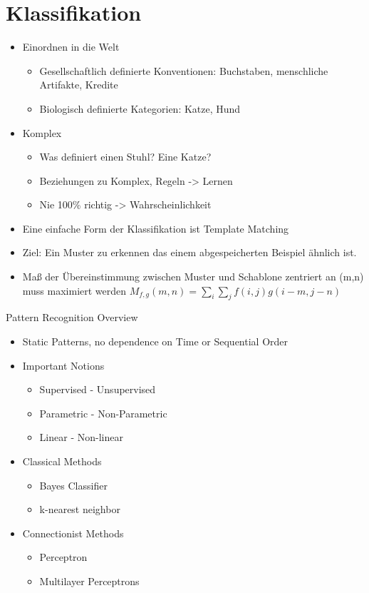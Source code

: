 
\chapter{Klassifikation}

\begin{itemize}
	\item Einordnen in die Welt
	\begin{itemize}
		\item Gesellschaftlich definierte Konventionen: Buchstaben, menschliche Artifakte, Kredite
		\item Biologisch definierte Kategorien: Katze, Hund
	\end{itemize}
	\item Komplex
	\begin{itemize}
		\item Was definiert einen Stuhl? Eine Katze?
		\item Beziehungen zu Komplex, Regeln -> Lernen
		\item Nie 100\% richtig -> Wahrscheinlichkeit
	\end{itemize}
\end{itemize}

\begin{itemize}
	\item Eine einfache Form der Klassifikation ist Template Matching
	\item Ziel: Ein Muster zu erkennen das einem abgespeicherten Beispiel ähnlich ist.
	\item Maß der Übereinstimmung zwischen Muster und Schablone zentriert an (m,n) muss maximiert werden
	$M_{f,g}(m,n)=\sum_i\sum_j f(i,j)g(i-m,j-n)$
\end{itemize}

Pattern Recognition Overview
\begin{itemize}
	\item Static Patterns, no dependence on Time or Sequential Order
	\item Important Notions
	\begin{itemize}
		\item Supervised - Unsupervised
		\item Parametric - Non-Parametric
		\item Linear - Non-linear
	\end{itemize}
	\item Classical Methods
	\begin{itemize}
		\item Bayes Classifier
		\item k-nearest neighbor
	\end{itemize}
	\item Connectionist Methods
	\begin{itemize}
		\item Perceptron
		\item Multilayer Perceptrons
	\end{itemize}
\end{itemize}

